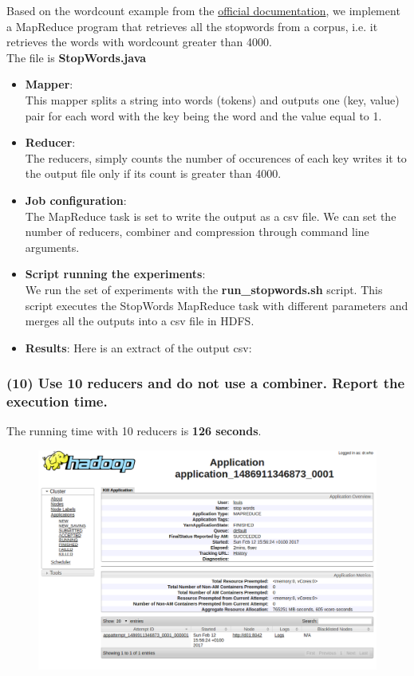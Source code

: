 \documentclass[a4paper,10pt]{article}
\begin{document}
Based on the wordcount example from the \href{https://hadoop.apache.org/docs/stable/hadoop-mapreduce-client/hadoop-mapreduce-client-core/MapReduceTutorial.html}{official documentation},
we implement a MapReduce program that retrieves all the stopwords from a corpus,
i.e. it retrieves the words with wordcount greater than 4000.
\\The file is \textbf{StopWords.java}
\begin{itemize}
  \item \textbf{Mapper}:\\
  This mapper splits a string into words (tokens) and outputs one (key, value) pair
  for each word with the key being the word and the value equal to 1.
  
  \item \textbf{Reducer}:\\
  The reducers, simply counts the number of occurences of each key writes it to
  the output file only if its count is greater than 4000.
  
  \item \textbf{Job configuration}:\\
  The MapReduce task is set to write the output as a csv file.
  We can set the number of reducers, combiner and compression through command line
  arguments.
  
  \item \textbf{Script running the experiments}:\\
  We run the set of experiments with the \textbf{run\_stopwords.sh} script.
  This script executes the StopWords MapReduce task with different parameters
  and merges all the outputs into a csv file in HDFS.
  
  \item \textbf{Results}:
  Here is an extract of the output csv:
  
\end{itemize}


\subsubsection{(10) Use 10 reducers and do not use a combiner. Report the execution time.}
The running time with 10 reducers is \textbf{126 seconds}.
\begin{figure}[H]
  \centering
  \includegraphics[width=.6\textwidth]{stopwords_10_reducers.png}
\end{figure}
\end{document}
